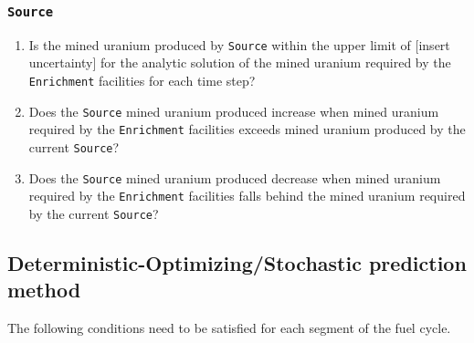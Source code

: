 \documentclass[12pt,letterpaper]{article}
\begin{document}
\subsubsection{\texttt{Source}}
\begin{enumerate}
\item Is the mined uranium produced by \texttt{Source} within the upper limit of [insert uncertainty] for the analytic solution of the mined uranium required by the \texttt{Enrichment} facilities for each time step? 

\item Does the \texttt{Source} mined uranium produced increase when mined uranium required by the \texttt{Enrichment} facilities exceeds mined uranium produced by the current \texttt{Source}?

\item Does the \texttt{Source} mined uranium produced decrease when mined uranium required by the \texttt{Enrichment} facilities falls behind the mined uranium required by the current \texttt{Source}?
\end{enumerate}

\subsection{Deterministic-Optimizing/Stochastic prediction method}
The following conditions need to be satisfied for each segment of the fuel cycle. 
\end{document}
